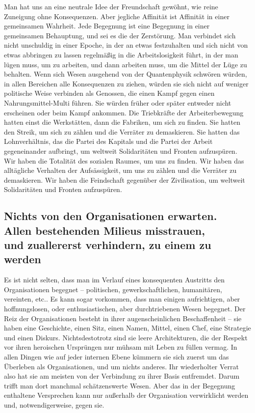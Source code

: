 Man hat uns an eine neutrale Idee der Freundschaft gewöhnt, wie
reine Zuneigung ohne Konsequenzen. Aber jegliche Affinität ist
Affinität in einer gemeinsamen Wahrheit. Jede Begegnung ist eine
Begegnung in einer gemeinsamen Behauptung, und sei es die der
Zerstörung. Man verbindet sich nicht unschuldig in einer Epoche, in
der an etwas festzuhalten und sich nicht von etwas abbringen zu
lassen regelmäßig in die Arbeitslosigkeit führt, in der man lügen
muss, um zu arbeiten, und dann arbeiten muss, um die Mittel der
Lüge zu behalten. Wenn sich Wesen ausgehend von der Quantenphysik
schwören würden, in allen Bereichen alle Konsequenzen zu ziehen,
würden sie sich nicht auf weniger politische Weise verbinden als
Genossen, die einen Kampf gegen einen Nahrungsmittel-Multi führen.
Sie würden früher oder später entweder nicht erscheinen oder beim
Kampf ankommen.
Die Triebkräfte der Arbeiterbewegung hatten einst die Werkstätten,
dann die Fabriken, um sich zu finden. Sie hatten den Streik, um
sich zu zählen und die Verräter zu demaskieren. Sie hatten das
Lohnverhältnis, das die Partei des Kapitals und die Partei der
Arbeit gegeneinander aufbringt, um weltweit Solidaritäten und
Fronten aufzuspüren. Wir haben die Totalität des sozialen Raumes,
um uns zu finden. Wir haben das alltägliche Verhalten der
Aufsässigkeit, um uns zu zählen und die Verräter zu demaskieren.
Wir haben die Feindschaft gegenüber der Zivilisation, um weltweit
Solidaritäten und Fronten aufzuspüren.

\subsection{Nichts von den Organisationen erwarten.\\
Allen bestehenden Milieus misstrauen,\\
und zuallererst verhindern, zu einem zu werden}

Es ist nicht selten, dass man im Verlauf eines konsequenten
Austritts den Organisationen begegnet – politischen,
gewerkschaftlichen, humanitären, vereinten, etc.. Es kann sogar
vorkommen, dass man einigen aufrichtigen, aber hoffnungslosen, oder
enthusiastischen, aber durchtriebenen Wesen begegnet. Der Reiz der
Organisationen besteht in ihrer augenscheinlichen Beschaffenheit –
sie haben eine Geschichte, einen Sitz, einen Namen, Mittel, einen
Chef, eine Strategie und einen Diskurs. Nichtsdestotrotz sind sie
leere Architekturen, die der Respekt vor ihren heroischen
Ursprüngen nur mühsam mit Leben zu füllen vermag. In allen Dingen
wie auf jeder internen Ebene kümmern sie sich zuerst um das
Überleben als Organisationen, und um nichts anderes. Ihr
wiederholter Verrat also hat sie am meisten von der Verbindung zu
ihrer Basis entfremdet. Darum trifft man dort manchmal
schätzenswerte Wesen. Aber das in der Begegnung enthaltene
Versprechen kann nur außerhalb der Organisation verwirklicht werden
und, notwendigerweise, gegen sie.
\extrapar{}

